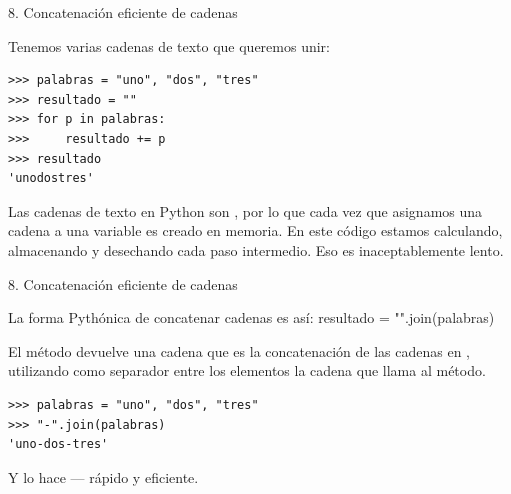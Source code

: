 \documentclass[14pt]{beamer}
\begin{document}
\begin{frame}[fragile]{8. Concatenación eficiente de cadenas}
  \small
  \begin{exampleblock}
    {Tenemos varias cadenas de texto que queremos unir:}
    \small
    \begin{lstlisting}
>>> palabras = "uno", "dos", "tres"
>>> resultado = ""
>>> for p in palabras:
>>>     resultado += p
>>> resultado
'unodostres'
    \end{lstlisting}
  \end{exampleblock}

  \begin{block}{}
    Las cadenas de texto en Python son , por lo
    que cada vez que asignamos una cadena a una variable  es creado en memoria. En este código estamos
    calculando, almacenando y desechando cada paso intermedio.
    Eso es inaceptablemente lento.
  \end{block}
\end{frame}

\begin{frame}[fragile]{8. Concatenación eficiente de cadenas}
  \begin{alertblock}
    {\centering \small
      La forma Pythónica de concatenar cadenas es así:}
    \centering \Large resultado = "".join(palabras)
  \end{alertblock}

  \small
  \begin{center}
    El método  devuelve una cadena que
    es la concatenación de las cadenas en ,
    utilizando como separador entre los elementos la cadena que llama
    al método.
  \end{center}

  \begin{exampleblock}{}
    \begin{lstlisting}
>>> palabras = "uno", "dos", "tres"
>>> "-".join(palabras)
'uno-dos-tres'
    \end{lstlisting}
  \end{exampleblock}

  \small
  \begin{center}
    Y lo hace  --- rápido y eficiente.
  \end{center}
\end{frame}
\end{document}
